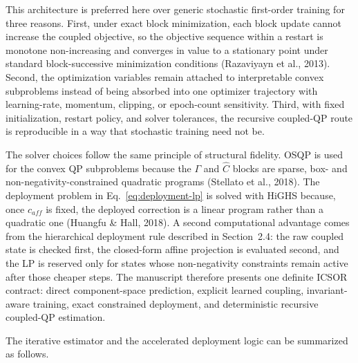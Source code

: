\documentclass[a4paper,fleqn]{cas-sc}
\newenvironment{revblock}{}{}
\newenvironment{revblockr127}{}{}
\begin{document}
\begin{revblock}
\begin{revblockr127}
This architecture is preferred here over generic stochastic first-order training for three reasons. First, under exact block minimization, each block update cannot increase the coupled objective, so the objective sequence within a restart is monotone non-increasing and converges in value to a stationary point under standard block-successive minimization conditions (Razaviyayn et al., 2013). Second, the optimization variables remain attached to interpretable convex subproblems instead of being absorbed into one optimizer trajectory with learning-rate, momentum, clipping, or epoch-count sensitivity. Third, with fixed initialization, restart policy, and solver tolerances, the recursive coupled-QP route is reproducible in a way that stochastic training need not be.

The solver choices follow the same principle of structural fidelity. OSQP is used for the convex QP subproblems because the $\Gamma$ and $\widehat{C}$ blocks are sparse, box- and non-negativity-constrained quadratic programs (Stellato et al., 2018). The deployment problem in Eq.~\eqref{eq:deployment-lp} is solved with HiGHS because, once $c_{aff}$ is fixed, the deployed correction is a linear program rather than a quadratic one (Huangfu \& Hall, 2018). A second computational advantage comes from the hierarchical deployment rule described in Section~2.4: the raw coupled state is checked first, the closed-form affine projection is evaluated second, and the LP is reserved only for states whose non-negativity constraints remain active after those cheaper steps. The manuscript therefore presents one definite ICSOR contract: direct component-space prediction, explicit learned coupling, invariant-aware training, exact constrained deployment, and deterministic recursive coupled-QP estimation.

The iterative estimator and the accelerated deployment logic can be summarized as follows.


\end{revblockr127}
\end{revblock}
\end{document}
